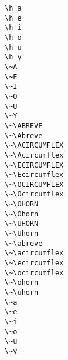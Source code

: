 \begin{multicols}{2}
 \verb|\h a| \\
 \verb|\h e| \\
 \verb|\h i| \\
 \verb|\h o| \\
 \verb|\h u| \\
 \verb|\h y| \\
 \verb|\~A| \\
 \verb|\~E| \\
 \verb|\~I| \\
 \verb|\~O| \\
 \verb|\~U| \\
 \verb|\~Y| \\
\X{\~\ABREVE} \verb|\~\ABREVE| \\
\X{\~\Abreve} \verb|\~\Abreve| \\
\X{\~\ACIRCUMFLEX} \verb|\~\ACIRCUMFLEX| \\
\X{\~\Acircumflex} \verb|\~\Acircumflex| \\
\X{\~\ECIRCUMFLEX} \verb|\~\ECIRCUMFLEX| \\
\X{\~\Ecircumflex} \verb|\~\Ecircumflex| \\
\X{\~\OCIRCUMFLEX} \verb|\~\OCIRCUMFLEX| \\
\X{\~\Ocircumflex} \verb|\~\Ocircumflex| \\
\X{\~\OHORN} \verb|\~\OHORN| \\
\X{\~\Ohorn} \verb|\~\Ohorn| \\
\X{\~\UHORN} \verb|\~\UHORN| \\
\X{\~\Uhorn} \verb|\~\Uhorn| \\
\X{\~\abreve} \verb|\~\abreve| \\
\X{\~\acircumflex} \verb|\~\acircumflex| \\
\X{\~\ecircumflex} \verb|\~\ecircumflex| \\
\X{\~\ocircumflex} \verb|\~\ocircumflex| \\
\X{\~\ohorn} \verb|\~\ohorn| \\
\X{\~\uhorn} \verb|\~\uhorn| \\
 \verb|\~a| \\
 \verb|\~e| \\
 \verb|\~i| \\
 \verb|\~o| \\
 \verb|\~u| \\
 \verb|\~y| \\
\end{multicols}

